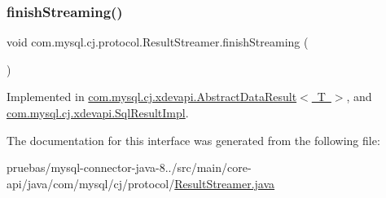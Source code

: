 \subsubsection{\texorpdfstring{finish\+Streaming()}{finishStreaming()}}
{\footnotesize\ttfamily void com.\+mysql.\+cj.\+protocol.\+Result\+Streamer.\+finish\+Streaming (\begin{DoxyParamCaption}{ }\end{DoxyParamCaption})}



Implemented in \mbox{\hyperlink{classcom_1_1mysql_1_1cj_1_1xdevapi_1_1_abstract_data_result_a6a37bb1022bc6bea43edf1f996dca4d4}{com.\+mysql.\+cj.\+xdevapi.\+Abstract\+Data\+Result$<$ T $>$}}, and \mbox{\hyperlink{classcom_1_1mysql_1_1cj_1_1xdevapi_1_1_sql_result_impl_a9ace870266358e357a46f584b3545dc6}{com.\+mysql.\+cj.\+xdevapi.\+Sql\+Result\+Impl}}.



The documentation for this interface was generated from the following file\+:\begin{DoxyCompactItemize}
\item 
pruebas/mysql-\/connector-\/java-\/8../src/main/core-\/api/java/com/mysql/cj/protocol/\mbox{\hyperlink{_result_streamer_8java}{Result\+Streamer.\+java}}\end{DoxyCompactItemize}
